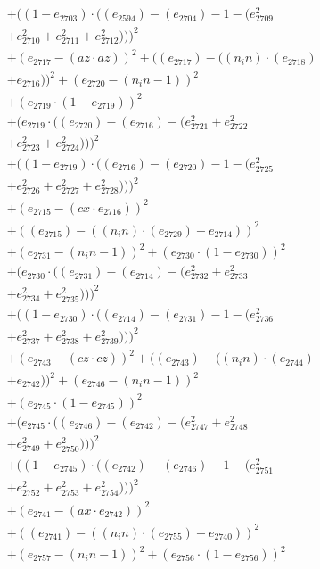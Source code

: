\documentclass[10pt, a4paper]{article}
\begin{document}
\begin{align*}
& + ((1 - e_{2703})  \cdot  ((e_{2594}) - (e_{2704}) - 1 - (e_{2709}^{2} \\
& + e_{2710}^{2} + e_{2711}^{2} + e_{2712}^{2})))^{2} \\
& + (e_{2717} - (az  \cdot  az))^{2} + ((e_{2717}) - ((n_in)  \cdot  (e_{2718}) \\
& + e_{2716}))^{2} + (e_{2720} - (n_in - 1))^{2} \\
& + (e_{2719}  \cdot  (1 - e_{2719}))^{2} \\
& + (e_{2719}  \cdot  ((e_{2720}) - (e_{2716}) - (e_{2721}^{2} + e_{2722}^{2} \\
& + e_{2723}^{2} + e_{2724}^{2})))^{2} \\
& + ((1 - e_{2719})  \cdot  ((e_{2716}) - (e_{2720}) - 1 - (e_{2725}^{2} \\
& + e_{2726}^{2} + e_{2727}^{2} + e_{2728}^{2})))^{2} \\
& + (e_{2715} - (cx  \cdot  e_{2716}))^{2} \\
& + ((e_{2715}) - ((n_in)  \cdot  (e_{2729}) + e_{2714}))^{2} \\
& + (e_{2731} - (n_in - 1))^{2} + (e_{2730}  \cdot  (1 - e_{2730}))^{2} \\
& + (e_{2730}  \cdot  ((e_{2731}) - (e_{2714}) - (e_{2732}^{2} + e_{2733}^{2} \\
& + e_{2734}^{2} + e_{2735}^{2})))^{2} \\
& + ((1 - e_{2730})  \cdot  ((e_{2714}) - (e_{2731}) - 1 - (e_{2736}^{2} \\
& + e_{2737}^{2} + e_{2738}^{2} + e_{2739}^{2})))^{2} \\
& + (e_{2743} - (cz  \cdot  cz))^{2} + ((e_{2743}) - ((n_in)  \cdot  (e_{2744}) \\
& + e_{2742}))^{2} + (e_{2746} - (n_in - 1))^{2} \\
& + (e_{2745}  \cdot  (1 - e_{2745}))^{2} \\
& + (e_{2745}  \cdot  ((e_{2746}) - (e_{2742}) - (e_{2747}^{2} + e_{2748}^{2} \\
& + e_{2749}^{2} + e_{2750}^{2})))^{2} \\
& + ((1 - e_{2745})  \cdot  ((e_{2742}) - (e_{2746}) - 1 - (e_{2751}^{2} \\
& + e_{2752}^{2} + e_{2753}^{2} + e_{2754}^{2})))^{2} \\
& + (e_{2741} - (ax  \cdot  e_{2742}))^{2} \\
& + ((e_{2741}) - ((n_in)  \cdot  (e_{2755}) + e_{2740}))^{2} \\
& + (e_{2757} - (n_in - 1))^{2} + (e_{2756}  \cdot  (1 - e_{2756}))^{2} \\

\end{align*}
\end{document}
